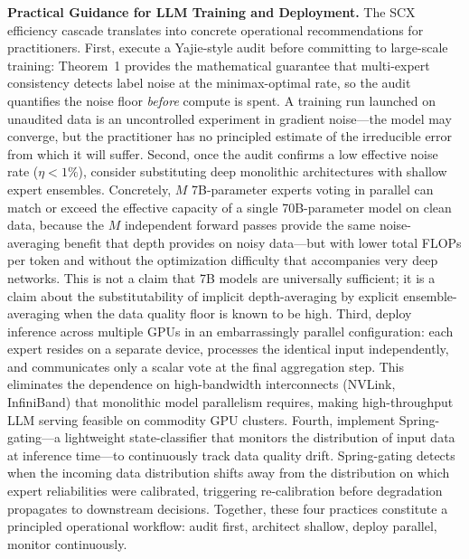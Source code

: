 \documentclass[11pt,twocolumn]{article}
\begin{document}
\textbf{Practical Guidance for LLM Training and Deployment.}
The SCX efficiency cascade translates into concrete operational recommendations for practitioners.
First, execute a Yajie-style audit before committing to large-scale training: Theorem~1 provides the mathematical guarantee that multi-expert consistency detects label noise at the minimax-optimal rate, so the audit quantifies the noise floor \textit{before} compute is spent. A training run launched on unaudited data is an uncontrolled experiment in gradient noise---the model may converge, but the practitioner has no principled estimate of the irreducible error from which it will suffer.
Second, once the audit confirms a low effective noise rate ($\eta < 1\%$), consider substituting deep monolithic architectures with shallow expert ensembles. Concretely, $M$ 7B-parameter experts voting in parallel can match or exceed the effective capacity of a single 70B-parameter model on clean data, because the $M$ independent forward passes provide the same noise-averaging benefit that depth provides on noisy data---but with lower total FLOPs per token and without the optimization difficulty that accompanies very deep networks. This is not a claim that 7B models are universally sufficient; it is a claim about the substitutability of implicit depth-averaging by explicit ensemble-averaging when the data quality floor is known to be high.
Third, deploy inference across multiple GPUs in an embarrassingly parallel configuration: each expert resides on a separate device, processes the identical input independently, and communicates only a scalar vote at the final aggregation step. This eliminates the dependence on high-bandwidth interconnects (NVLink, InfiniBand) that monolithic model parallelism requires, making high-throughput LLM serving feasible on commodity GPU clusters.
Fourth, implement Spring-gating---a lightweight state-classifier that monitors the distribution of input data at inference time---to continuously track data quality drift. Spring-gating detects when the incoming data distribution shifts away from the distribution on which expert reliabilities were calibrated, triggering re-calibration before degradation propagates to downstream decisions.
Together, these four practices constitute a principled operational workflow: audit first, architect shallow, deploy parallel, monitor continuously.
\end{document}
